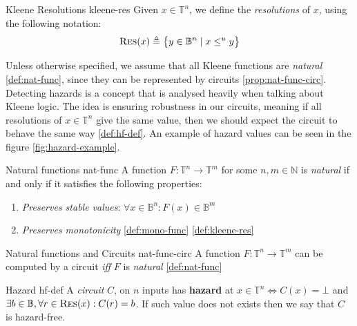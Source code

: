 \begin{definitionbox}{Kleene Resolutions \cite{mukaidono_BternaryLogicFunction_1972, ikenmeyer_ComplexityHazardfreeCircuits_2019}}{kleene-res}
	Given $x \in \mathbb{T}^n$, we define the \textit{resolutions} of $x$, using the following notation:
	$$
		\textnormal{\textsc{Res}}(x) \triangleq \big\{ y \in \mathbb{B}^n \mid x \leq^u y  \big\}
	$$
\end{definitionbox}

Unless otherwise specified, we assume that all Kleene functions are \textit{natural} \ref{def:nat-func}, since
they can be represented by circuits \ref{prop:nat-func-circ}.
Detecting hazards is a concept that is analysed heavily when talking about Kleene logic.
The idea is ensuring robustness in our circuits, meaning if all resolutions of $x \in \mathbb{T}^n$
give the same value, then we should expect the circuit to behave the same way \ref{def:hf-def}.
An example of hazard values can be seen in the figure \ref{fig:hazard-example}.


\begin{definitionbox}{Natural functions \cite{ikenmeyer_ComplexityHazardfreeCircuits_2019}}{nat-func}
	A function $F: \mathbb{T}^n \to \mathbb{T}^m$ for some $n, m \in \mathbb{N}$ is \textit{natural} if and only
	if it satisfies the following properties:
	\begin{enumerate}
		\item \textit{Preserves stable values}: $\forall x \in \mathbb{B}^n: F(x) \in \mathbb{B}^m$
		\item \textit{Preserves monotonicity} \ref{def:mono-func} \ref{def:kleene-res}
	\end{enumerate}
\end{definitionbox}

\begin{propositionbox}{Natural functions and Circuits \cite{mukaidono_BternaryLogicFunction_1972,ikenmeyer_ComplexityHazardfreeCircuits_2019}}{nat-func-circ}
	A function $F: \mathbb{T}^n \to \mathbb{T}^m$ can be computed by a circuit \textit{iff} $F$ is \textit{natural} \ref{def:nat-func}
\end{propositionbox}

\begin{definitionbox}{Hazard \cite{ikenmeyer_ComplexityHazardfreeCircuits_2019, eichelberger_HazardDetectionCombinational_1965}}{hf-def}
	A \textit{circuit} $C$, on $n$ inputs has \textbf{hazard} at $x \in \mathbb{T}^n \iff C(x) = \bot$
	and $\exists b \in \mathbb{B}, \forall r \in \textnormal{\textsc{Res}}(x): C(r) = b$. If such value does not exists
	then we say that $C$ is hazard-free.
\end{definitionbox}

